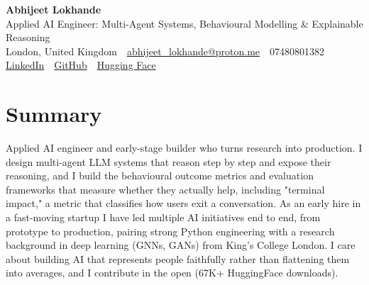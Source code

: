 \documentclass[10pt,a4paper]{article}
\newcommand{\sep}{\,\textcolor{accent!60}{\textbar}\,}
\begin{document}
\begin{center}
  {\fontsize{24}{26}\selectfont\bfseries Abhijeet Lokhande}\\[3pt]
  {\color{accent}\large Applied AI Engineer: Multi-Agent Systems, Behavioural Modelling \& Explainable Reasoning}\\[5pt]
  {\small
    London, United Kingdom \sep
    \href{mailto:abhijeet_lokhande@proton.me}{abhijeet\_lokhande@proton.me} \sep
    07480801382 \\[2pt]
    \href{https://www.linkedin.com/in/ablds/}{LinkedIn} \sep
    \href{https://github.com/abhijeetscode}{GitHub} \sep
    \href{https://huggingface.co/ab-ai}{Hugging Face}
  }
\end{center}
\vspace{2pt}

\section{Summary}
Applied AI engineer and early-stage builder who turns research into production. I design multi-agent LLM systems that reason step by step and expose their reasoning, and I build the behavioural outcome metrics and evaluation frameworks that measure whether they actually help, including "terminal impact," a metric that classifies how users exit a conversation. As an early hire in a fast-moving startup I have led multiple AI initiatives end to end, from prototype to production, pairing strong Python engineering with a research background in deep learning (GNNs, GANs) from King's College London. I care about building AI that represents people faithfully rather than flattening them into averages, and I contribute in the open (67K+ HuggingFace downloads).

\end{document}
